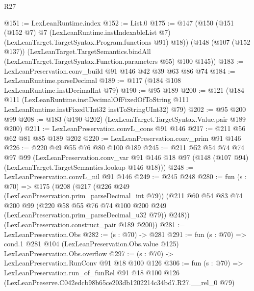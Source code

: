 \begin{lexlean}{R27}
\begin{coremodule}
@151 := LexLeanRuntime.index
@152 := List.{0}
@175 := @147
    (@150
      (@151
        (@152 @7)
        @7
        (LexLeanRuntime.instIndexableList @7)
        (LexLeanTarget.TargetSyntax.Program.functions @91)
        @18))
    (@148
      (@107 (@152 @137))
      (LexLeanTarget.TargetSemantics.bindAll
        (LexLeanTarget.TargetSyntax.Function.parameters @65)
        @100
        @145))
@183 := LexLeanPreservation.conv_build @91 @146 @42 @39 @63 @86 @74
@184 := LexLeanRuntime.parseDecimal
@189 := @117 (@184 @108 LexLeanRuntime.instDecimalInt @79)
@190 := @95 @189
@200 := @121
    (@184
      @111
      (LexLeanRuntime.instDecimalOfFixedOfToString
        @111
        LexLeanRuntime.instFixedUInt32
        instToStringUInt32)
      @79)
@202 := @95 @200 @99
@208 := @183 (@190 @202) (LexLeanTarget.TargetSyntax.Value.pair @189 @200)
@211 := LexLeanPreservation.convL_cons @91 @146
@217 := @211 @56 @62 @81 @85 @189 @202
@220 := LexLeanPreservation.conv_prim @91 @146
@226 := @220 @49 @55 @76 @80 @100 @189
@245 := @211
    @52
    @54
    @74
    @74
    @97
    @99
    (LexLeanPreservation.conv_var
      @91
      @146
      @18
      @97
      (@148 (@107 @94) (LexLeanTarget.TargetSemantics.lookup @146 @18)))
@248 := LexLeanPreservation.convL_nil @91 @146
@249 := @245 @248
@280 := fun (s : @70) =>
  @175
    (@208
      (@217
        (@226 @249 (LexLeanPreservation.prim_parseDecimal_int @79))
        (@211
          @60
          @54
          @83
          @74
          @200
          @99
          (@220 @58 @55 @76 @74 @100 @200 @249 (LexLeanPreservation.prim_parseDecimal_u32 @79))
          @248))
      (LexLeanPreservation.construct_pair @189 @200))
@281 := LexLeanPreservation.Obs
@282 := (s : @70) -> @281
@291 := fun (s : @70) =>
  cond.{1} @281 @104 (LexLeanPreservation.Obs.value @125) LexLeanPreservation.Obs.overflow
@297 := (s : @70) -> LexLeanPreservation.RunConv @91 @18 @100 @126
@306 := fun (s : @70) =>
  LexLeanPreservation.run_of_funRel
    @91
    @18
    @100
    @126
    (LexLeanPreserve.C042edcb98b65ce203db1202214c34bd7.R27.__rel_0 @79)
\end{coremodule}
\end{lexlean}
